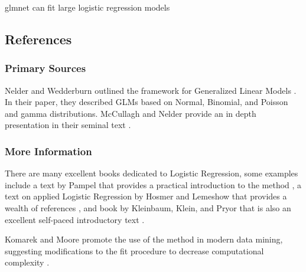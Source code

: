 


glmnet can fit large logistic regression models

\subsection{References}

\subsubsection{Primary Sources}
Nelder and Wedderburn outlined the framework for Generalized Linear Models \cite{Nelder1972}. In their paper, they described GLMs based on Normal, Binomial, and Poisson and gamma distributions.
McCullagh and Nelder provide an in depth presentation in their seminal text \cite{McCullagh1989}.


\subsubsection{More Information}
There are many excellent books dedicated to Logistic Regression, some examples include a text by Pampel that provides a practical introduction to the method \cite{Pampel2000}, a text on applied Logistic Regression by Hosmer and Lemeshow that provides a wealth of references \cite{Hosmer2000}, and book by Kleinbaum, Klein, and Pryor that is also an excellent self-paced introductory text \cite{Kleinbaum2010}.

Komarek and Moore promote the use of the method in modern data mining, suggesting modifications to the fit procedure to decrease computational complexity \cite{Komarek2005}.



